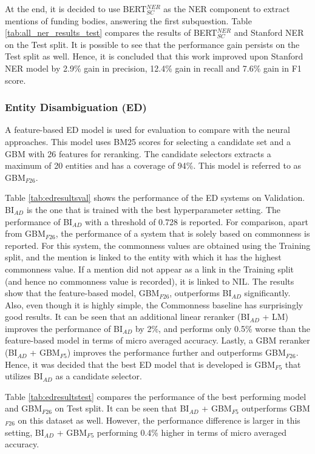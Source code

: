 \documentclass{report}
\theoremstyle{definition}
\theoremstyle{remark}
\begin{document}
At the end, it is decided to use BERT$^{NER}_{SC}$ as the NER component to extract mentions of funding bodies, answering the first subquestion. Table \ref{tab:all_ner_results_test} compares the results of BERT$^{NER}_{SC}$ and Stanford NER on the Test split. It is possible to see that the performance gain persists on the Test split as well. Hence, it is concluded that this work improved upon Stanford NER model by 2.9\% gain in precision, 12.4\% gain in recall and 7.6\% gain in F1 score.
\subsubsection{Entity Disambiguation (ED)}

A feature-based ED model is used for evaluation to compare with the neural approaches. This model uses BM25 \cite{bm25} scores for selecting a candidate set and a GBM with 26 features for reranking. The candidate selectors extracts a maximum of 20 entities and has a coverage of 94\%. This model is referred to as GBM$_{F26}$.

Table \ref{tab:edresultsval} shows the performance of the ED systems on Validation. BI$_{AD}$ is the one that is trained with the best hyperparameter setting. The performance of BI$_{AD}$ with a threshold of 0.728 is reported. For comparison, apart from GBM$_{F26}$, the performance of a system that is solely based on commonness is reported. For this system, the commonness values are obtained using the Training split, and the mention is linked to the entity with which it has the highest commonness value. If a mention did not appear as a link in the Training split (and hence no commonness value is recorded), it is linked to NIL. The results show that the feature-based model, GBM$_{F26}$, outperforms BI$_{AD}$ significantly. Also, even though it is highly simple, the Commonness baseline has surprisingly good results. It can be seen that an additional linear reranker (BI$_{AD}$ + LM) improves the performance of BI$_{AD}$ by 2\%, and performs only 0.5\% worse than the feature-based model in terms of micro averaged accuracy. Lastly, a GBM reranker (BI$_{AD}$ + GBM$_{F5}$) improves the performance further and outperforms GBM$_{F26}$. Hence, it was decided that the best ED model that is developed is GBM$_{F5}$ that utilizes BI$_{AD}$ as a candidate selector.

Table \ref{tab:edresultstest} compares the performance of the best performing model and GBM$_{F26}$ on Test split. It can be seen that BI$_{AD}$ + GBM$_{F5}$ outperforms GBM$_{F26}$  on this dataset as well. However, the performance difference is larger in this setting, BI$_{AD}$ + GBM$_{F5}$ performing 0.4\% higher in terms of micro averaged accuracy.
\end{document}
